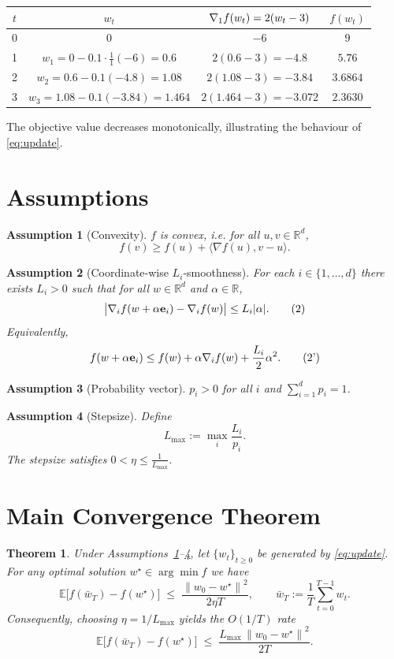 \documentclass{article}
\newtheorem{theorem}{Theorem}
\newtheorem{assumption}{Assumption}
\newcommand{\E}{\mathbb{E}}
\newcommand{\R}{\mathbb{R}}
\newcommand{\norm}[1]{\left\lVert#1\right\rVert}
\newcommand{\ip}[2]{\langle #1,#2\rangle}
\newcommand{\grad}[1]{\nabla #1}
\newcommand{\e}{\mathbf{e}}
\begin{document}
\begin{center}
\begin{tabular}{c|c|c|c}
$t$ & $w_t$ & $\grad_1 f(w_t)=2(w_t-3)$ & $f(w_t)$\\ \hline
0 & $0$ & $-6$ & $9$\\
1 & $w_1=0-0.1\cdot\frac{1}{1}(-6)=0.6$ & $2(0.6-3)=-4.8$ & $5.76$\\
2 & $w_2=0.6-0.1(-4.8)=1.08$ & $2(1.08-3)=-3.84$ & $3.6864$\\
3 & $w_3=1.08-0.1(-3.84)=1.464$ & $2(1.464-3)=-3.072$ & $2.3630$\\
\end{tabular}
\end{center}
The objective value decreases monotonically, illustrating the behaviour of \eqref{eq:update}.

\newpage
\section*{Assumptions}
\begin{assumption}[Convexity]\label{as:convex}
$f$ is convex, i.e. for all $u,v\in\R^{d}$,
\[
f(v)\ge f(u)+\ip{\grad f(u)}{v-u}.
\]
\end{assumption}
\begin{assumption}[Coordinate‑wise $L_i$‑smoothness]\label{as:smooth}
For each $i\in\{1,\dots,d\}$ there exists $L_i>0$ such that for all $w\in\R^{d}$ and $\alpha\in\R$,
\[
\bigl|\grad_i f(w+\alpha \e_i)-\grad_i f(w)\bigr|\le L_i|\alpha|.
\tag{2}
\]
Equivalently,
\[
f(w+\alpha \e_i)\le f(w)+\alpha\grad_i f(w)+\frac{L_i}{2}\alpha^{2}.
\tag{2'}
\]
\end{assumption}
\begin{assumption}[Probability vector]\label{as:prob}
$p_i>0$ for all $i$ and $\sum_{i=1}^{d}p_i=1$.
\end{assumption}
\begin{assumption}[Stepsize]\label{as:stepsize}
Define 
\[
L_{\max}:=\max_{i}\frac{L_i}{p_i}.
\]
The stepsize satisfies $0<\eta\le \frac{1}{L_{\max}}$.
\end{assumption}

\section*{Main Convergence Theorem}
\begin{theorem}\label{thm:main}
Under Assumptions~\ref{as:convex}–\ref{as:stepsize}, let $\{w_t\}_{t\ge0}$ be generated by \eqref{eq:update}.  For any optimal solution $w^{\star}\in\arg\min f$ we have
\[
\E\!\bigl[f(\bar w_T)-f(w^{\star})\bigr]
\;\le\;
\frac{\norm{w_0-w^{\star}}^{2}}{2\eta T},
\qquad
\bar w_T:=\frac1T\sum_{t=0}^{T-1}w_t .
\tag{3}
\]
Consequently, choosing $\eta=1/L_{\max}$ yields the $O(1/T)$ rate
\[
\E\!\bigl[f(\bar w_T)-f(w^{\star})\bigr]
\;\le\;
\frac{L_{\max}\,\norm{w_0-w^{\star}}^{2}}{2T}.
\]
\end{theorem}
\end{document}
